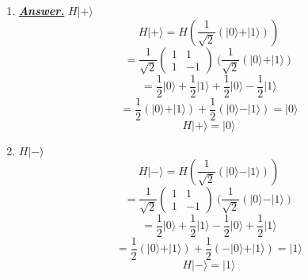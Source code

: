 \documentclass[12pt]{article}
\newcommand{\ket}[1]{\vert{#1}\rangle}
\begin{document}
\begin{enumerate}
\begin{enumerate}
    \item \underline{\textbf{\emph{Answer.}}} $H\ket{+}$
    $$ 
    H\ket{+} = H(\frac{1}{\sqrt{2}} (\ket{0}+\ket{1})) $$
    $$
    = \frac{1}{\sqrt{2}}  \left(\begin{array}{cc} 1 & 1 \\ 1 & -1 \end{array}\right) \ (\frac{1}{\sqrt{2}} (\ket{0}+\ket{1})$$
    $$
    = \frac{1}{2} \ket{0} + \frac{1}{2} \ket{1} + \frac{1}{2}\ket{0} - \frac{1}{2} \ket{1} $$
    $$
    = \frac{1}{2} (\ket{0}+\ket{1}) + \frac{1}{2}(\ket{0}-\ket{1}) = \ket{0} $$
    $$
    H\ket{+} = \ket{0} $$
    \item $ H\ket{-} $
    $$ 
    H\ket{-} = H(\frac{1}{\sqrt{2}} (\ket{0}-\ket{1})) $$
    $$
    = \frac{1}{\sqrt{2}}  \left(\begin{array}{cc} 1 & 1 \\ 1 & -1 \end{array}\right) \ (\frac{1}{\sqrt{2}} (\ket{0}-\ket{1})$$
    $$
    = \frac{1}{2} \ket{0} + \frac{1}{2} \ket{1} - \frac{1}{2}\ket{0} + \frac{1}{2} \ket{1} $$
    $$
    = \frac{1}{2} (\ket{0}+\ket{1}) + \frac{1}{2}(-\ket{0}+\ket{1}) = \ket{1} $$
    $$
    H\ket{-} = \ket{1} $$
\end{enumerate}

\end{enumerate}
\end{document}
